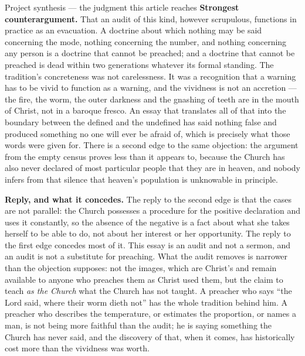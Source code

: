 \begin{studybox}{Project synthesis --- the judgment this article reaches}
\textbf{Strongest counterargument.} That an audit of this kind, however scrupulous, functions in practice as an evacuation. A doctrine about which nothing may be said concerning the mode, nothing concerning the number, and nothing concerning any person is a doctrine that cannot be preached; and a doctrine that cannot be preached is dead within two generations whatever its formal standing. The tradition's concreteness was not carelessness. It was a recognition that a warning has to be vivid to function as a warning, and the vividness is not an accretion --- the fire, the worm, the outer darkness and the gnashing of teeth are in the mouth of Christ, not in a baroque fresco. An essay that translates all of that into the boundary between the defined and the undefined has said nothing false and produced something no one will ever be afraid of, which is precisely what those words were given for. There is a second edge to the same objection: the argument from the empty census proves less than it appears to, because the Church has also never declared of most particular people that they are in heaven, and nobody infers from that silence that heaven's population is unknowable in principle.

\textbf{Reply, and what it concedes.} The reply to the second edge is that the cases are not parallel: the Church possesses a procedure for the positive declaration and uses it constantly, so the absence of the negative is a fact about what she takes herself to be able to do, not about her interest or her opportunity. The reply to the first edge concedes most of it. This essay is an audit and not a sermon, and an audit is not a substitute for preaching. What the audit removes is narrower than the objection supposes: not the images, which are Christ's and remain available to anyone who preaches them as Christ used them, but the claim to teach \emph{as the Church} what the Church has not taught. A preacher who says ``the Lord said, where their worm dieth not'' has the whole tradition behind him. A preacher who describes the temperature, or estimates the proportion, or names a man, is not being more faithful than the audit; he is saying something the Church has never said, and the discovery of that, when it comes, has historically cost more than the vividness was worth.


\end{studybox}
